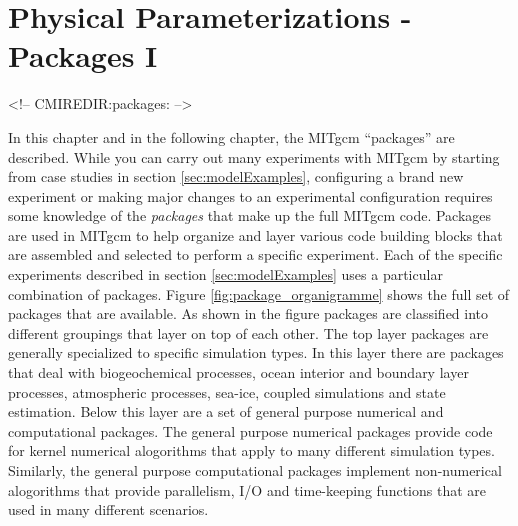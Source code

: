 
\chapter{Physical Parameterizations - Packages I}
\label{chap:packagesI}

\begin{rawhtml}
<!-- CMIREDIR:packages: -->
\end{rawhtml}

In this chapter and in the following chapter, the MITgcm ``packages'' are
described. While you can carry out many experiments with MITgcm by starting
from case studies in section \ref{sec:modelExamples}, configuring
a brand new experiment or making major changes to an experimental configuration
requires some knowledge of the {\it packages}
that make up the full MITgcm code. Packages are used in MITgcm to
help organize and layer various code building blocks that are assembled
and selected to perform a specific experiment. Each of the specific experiments
described in section \ref{sec:modelExamples} uses a particular combination
of packages.
Figure \ref{fig:package_organigramme} shows the full set of packages that
are available. As shown in the figure packages are classified into different
groupings that layer on top of each other. The top layer packages are
generally specialized to specific simulation types. In this layer there are
packages that deal with biogeochemical processes, ocean interior
and boundary layer processes, atmospheric processes, sea-ice, coupled
simulations and state estimation.
Below this layer are a set of general purpose
numerical and computational packages. The general purpose numerical packages
provide code for kernel numerical alogorithms
that apply to
many different simulation types. Similarly, the general purpose computational
packages implement non-numerical alogorithms that provide parallelism,
I/O and time-keeping functions that are used in many different scenarios.

